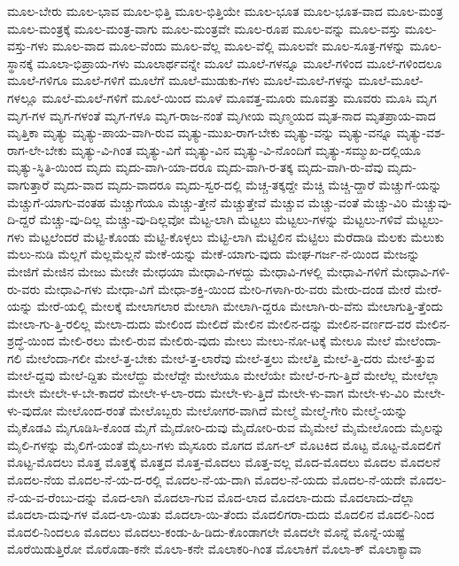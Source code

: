 {ಮೂಲ-ಬೇರು
ಮೂಲ-ಭಾವ
ಮೂಲ-ಭಿತ್ತಿ
ಮೂಲ-ಭಿತ್ತಿಯೇ
ಮೂಲ-ಭೂತ
ಮೂಲ-ಭೂತ-ವಾದ
ಮೂಲ-ಮಂತ್ರ
ಮೂಲ-ಮಂತ್ರಕ್ಕೆ
ಮೂಲ-ಮಂತ್ರ-ವಾಗು
ಮೂಲ-ಮಂತ್ರವೇ
ಮೂಲ-ರೂಪ
ಮೂಲ-ವನ್ನು
ಮೂಲ-ವಸ್ತು
ಮೂಲ-ವಸ್ತು-ಗಳು
ಮೂಲ-ವಾದ
ಮೂಲ-ವೆಂದು
ಮೂಲ-ವೆಲ್ಲ
ಮೂಲ-ವೆಲ್ಲಿ
ಮೂಲವೇ
ಮೂಲ-ಸೂತ್ರ-ಗಳನ್ನು
ಮೂಲ-ಸ್ಥಾನಕ್ಕೆ
ಮೂಲಾ-ಭಿಪ್ರಾಯ-ಗಳು
ಮೂಲಾರ್ಥವನ್ನೇ
ಮೂಲೆ
ಮೂಲೆ-ಗಳನ್ನೂ
ಮೂಲೆ-ಗಳಿಂದ
ಮೂಲೆ-ಗಳಿಂದಲೂ
ಮೂಲೆ-ಗಳಿಗೂ
ಮೂಲೆ-ಗಳಿಗೆ
ಮೂಲೆಗೆ
ಮೂಲೆ-ಮುಡುಕು-ಗಳು
ಮೂಲೆ-ಮೂಲೆ-ಗಳನ್ನು
ಮೂಲೆ-ಮೂಲೆ-ಗಳಲ್ಲೂ
ಮೂಲೆ-ಮೂಲೆ-ಗಳಿಗೆ
ಮೂಲೆ-ಯಿಂದ
ಮೂಳೆ
ಮೂವತ್ತ-ಮೂರು
ಮೂವತ್ತು
ಮೂವರು
ಮೂಸಿ
ಮೃಗ
ಮೃಗ-ಗಳ
ಮೃಗ-ಗಳಂತೆ
ಮೃಗ-ಗಳೂ
ಮೃಗ-ರಾಜ-ನಂತೆ
ಮೃಗೀಯ
ಮೃಣ್ಮಯದ
ಮೃತ-ನಾದ
ಮೃತಪ್ರಾಯ-ವಾದ
ಮೃತ್ತಿಕಾ
ಮೃತ್ಯು
ಮೃತ್ಯು-ಪಾಯ-ವಾಗಿ-ರುವ
ಮೃತ್ಯು-ಮುಖ-ರಾಗ-ಬೇಕು
ಮೃತ್ಯು-ವನ್ನು
ಮೃತ್ಯು-ವನ್ನೂ
ಮೃತ್ಯು-ವಶ-ರಾಗ-ಲೇ-ಬೇಕು
ಮೃತ್ಯು-ವಿ-ಗಿಂತ
ಮೃತ್ಯು-ವಿಗೆ
ಮೃತ್ಯು-ವಿನ
ಮೃತ್ಯು-ವಿ-ನೊಂದಿಗೆ
ಮೃತ್ಯು-ಸಮ್ಮುಖ-ದಲ್ಲಿಯೂ
ಮೃತ್ಯು-ಸ್ಥಿತಿ-ಯಿಂದ
ಮೃದು
ಮೃದು-ವಾಗಿ-ಯಾ-ದರೂ
ಮೃದು-ವಾಗಿ-ರ-ತಕ್ಕ
ಮೃದು-ವಾಗಿ-ರು-ವೆವು
ಮೃದು-ವಾಗುತ್ತಾರೆ
ಮೃದು-ವಾದ
ಮೃದು-ವಾದರೂ
ಮೃದು-ಸ್ವರ-ದಲ್ಲಿ
ಮೆಚ್ಚ-ತಕ್ಕದ್ದೇ
ಮೆಚ್ಚಿ
ಮೆಚ್ಚಿ-ದ್ದಾರೆ
ಮೆಚ್ಚುಗೆ-ಯನ್ನು
ಮೆಚ್ಚುಗೆ-ಯಾಗು-ವಂತಹ
ಮೆಚ್ಚುಗೆಯೂ
ಮೆಚ್ಚು-ತ್ತೇನೆ
ಮೆಚ್ಚುತ್ತೇವೆ
ಮೆಚ್ಚುವ
ಮೆಚ್ಚು-ವಂತೆ
ಮೆಚ್ಚು-ವಿರಿ
ಮೆಚ್ಚುವು-ದಿ-ದ್ದರೆ
ಮೆಚ್ಚು-ವು-ದಿಲ್ಲ
ಮೆಚ್ಚು-ವು-ದಿಲ್ಲವೋ
ಮೆಟ್ಟ-ಲಾಗಿ
ಮೆಟ್ಟಲು
ಮೆಟ್ಟಲು-ಗಳನ್ನು
ಮೆಟ್ಟಲು-ಗಳಿವೆ
ಮೆಟ್ಟಲು-ಗಳು
ಮೆಟ್ಟಲೆಂದರೆ
ಮೆಟ್ಟಿ-ಕೊಂಡು
ಮೆಟ್ಟಿ-ಕೊಳ್ಳಲು
ಮೆಟ್ಟಿ-ಲಾಗಿ
ಮೆಟ್ಟಿಲಿನ
ಮೆಟ್ಟಿಲು
ಮೆರೆದಾಡಿ
ಮೆಲಕು
ಮೆಲುಕು
ಮೆಲು-ನುಡಿ
ಮೆಲ್ಲಗೆ
ಮೆಲ್ಲಮೆಲ್ಲನೆ
ಮೇಕೆ-ಯನ್ನು
ಮೇಕೆ-ಯಾಗು-ವುದು
ಮೇಘ-ಗರ್ಜ-ನೆ-ಯಿಂದ
ಮೇಜನ್ನು
ಮೇಜಿಗೆ
ಮೇಜಿನ
ಮೇಜು
ಮೇಜೇ
ಮೇಧಯಾ
ಮೇಧಾವಿ-ಗಳದ್ದು
ಮೇಧಾವಿ-ಗಳಲ್ಲಿ
ಮೇಧಾವಿ-ಗಳಿಗೆ
ಮೇಧಾವಿ-ಗಳಿ-ರು-ವರು
ಮೇಧಾವಿ-ಗಳು
ಮೇಧಾ-ವಿಗೆ
ಮೇಧಾ-ಶಕ್ತಿ-ಯಿಂದ
ಮೇರಿ-ಗಳಾಗಿ-ರು-ವರು
ಮೇರು-ದಂಡ
ಮೇರೆ
ಮೇರೆ-ಯನ್ನು
ಮೇರೆ-ಯಲ್ಲಿ
ಮೇಲಕ್ಕೆ
ಮೇಲಾಗಲಾರ
ಮೇಲಾಗಿ
ಮೇಲಾಗಿ-ದ್ದರೂ
ಮೇಲಾಗಿ-ರು-ವೆನು
ಮೇಲಾಗುತ್ತಿ-ತ್ತೆಂದು
ಮೇಲಾ-ಗು-ತ್ತಿ-ರಲಿಲ್ಲ
ಮೇಲಾ-ದುದು
ಮೇಲಿಂದ
ಮೇಲಿದೆ
ಮೇಲಿನ
ಮೇಲಿನ-ದನ್ನು
ಮೇಲಿನ-ವರ್ಣದ-ವರ
ಮೇಲಿನ-ಶ್ರದ್ಧೆ-ಯಿಂದ
ಮೇಲಿ-ರಲು
ಮೇಲಿ-ರುವ
ಮೇಲಿರು-ವುದು
ಮೇಲು
ಮೇಲು-ನೋ-ಟಕ್ಕೆ
ಮೇಲೂ
ಮೇಲೆ
ಮೇಲೆಂದಾ-ಗಲಿ
ಮೇಲೆಂದಾ-ಗಲೀ
ಮೇಲೆ-ತ್ತ-ಬೇಕು
ಮೇಲೆ-ತ್ತ-ಲಾರೆವು
ಮೇಲೆ-ತ್ತಲು
ಮೇಲೆತ್ತಿ
ಮೇಲೆ-ತ್ತಿ-ದರು
ಮೇಲೆ-ತ್ತುವ
ಮೇಲೆ-ದ್ದವು
ಮೇಲೆ-ದ್ದಿತು
ಮೇಲೆದ್ದು
ಮೇಲೆದ್ದೇ
ಮೇಲೆಯೂ
ಮೇಲೆಯೇ
ಮೇಲೆ-ರ-ಗು-ತ್ತಿದೆ
ಮೇಲೆಲ್ಲ
ಮೇಲೆಲ್ಲಾ
ಮೇಲೇ
ಮೇಲೇ-ಳ-ಬೇ-ಕಾದರೆ
ಮೇಲೇ-ಳ-ಲಾ-ರದು
ಮೇಲೇ-ಳು-ತ್ತಿದೆ
ಮೇಲೇ-ಳು-ವಾಗ
ಮೇಲೇ-ಳು-ವಿರಿ
ಮೇಲೇ-ಳು-ವುದೋ
ಮೇಲೊಂದ-ರಂತೆ
ಮೇಲೊಬ್ಬರು
ಮೇಲೋಗರ-ವಾಗಿದೆ
ಮೇಲ್ಮೆ
ಮೇಲ್ಮೆ-ಗೇರಿ
ಮೇಲ್ಮೆ-ಯನ್ನು
ಮೈಕೊಡವಿ
ಮೈಗೂಡಿಸಿ-ಕೊಂಡ
ಮೈಗೆ
ಮೈದೋರಿ-ದುವು
ಮೈದೋರಿ-ರುವ
ಮೈಮೇಲೆ
ಮೈಮೇಲೊಂದು
ಮೈಲನ್ನು
ಮೈಲಿ-ಗಳನ್ನು
ಮೈಲಿಗೆ-ಯಂತೆ
ಮೈಲು-ಗಳು
ಮೈಸೂರು
ಮೊಗದ
ಮೊಗ-ಲ್
ಮೊಟಕಿದ
ಮೊಟ್ಟ
ಮೊಟ್ಟ-ಮೊದಲಿಗೆ
ಮೊಟ್ಟ-ಮೊದಲು
ಮೊತ್ತ
ಮೊತ್ತಕ್ಕೆ
ಮೊತ್ತದ
ಮೊತ್ತ-ಮೊದಲು
ಮೊತ್ತ-ವಲ್ಲ
ಮೊದ-ಮೊದಲು
ಮೊದಲ
ಮೊದಲನೆ
ಮೊದಲ-ನೆಯ
ಮೊದಲ-ನೆ-ಯ-ದ-ರಲ್ಲಿ
ಮೊದಲ-ನೆ-ಯ-ದಾಗಿ
ಮೊದಲ-ನೆ-ಯದು
ಮೊದಲ-ನೆ-ಯದೇ
ಮೊದಲ-ನೆ-ಯ-ವ-ರೆಂಬು-ದನ್ನು
ಮೊದ-ಲಾಗಿ
ಮೊದಲಾ-ಗುವ
ಮೊದ-ಲಾದ
ಮೊದಲಾ-ದುದು
ಮೊದಲಾದು-ದೆಲ್ಲಾ
ಮೊದಲಾ-ದುವು-ಗಳ
ಮೊದ-ಲಾ-ಯಿತು
ಮೊದಲಾ-ಯಿ-ತೆಂದು
ಮೊದಲಿಗರಾ-ದುದು
ಮೊದಲಿನ
ಮೊದಲಿ-ನಿಂದ
ಮೊದಲಿ-ನಿಂದಲೂ
ಮೊದಲು
ಮೊದಲು-ಕಂಡು-ಹಿ-ಡಿದು-ಕೊಂಡಾಗಲೇ
ಮೊದಲೇ
ಮೊನ್ನೆ
ಮೊನ್ನೆ-ಯಷ್ಟೆ
ಮೊರೆಯಿಡುತ್ತಿರೋ
ಮೊರೊಡಾ-ಕನೇ
ಮೊಲಾ-ಕನೇ
ಮೊಲಾಕರಿ-ಗಿಂತ
ಮೊಲಾಕಿಗೆ
ಮೊಲಾ-ಕ್
ಮೊಲಾಕ್ಯಾವಾ
}
